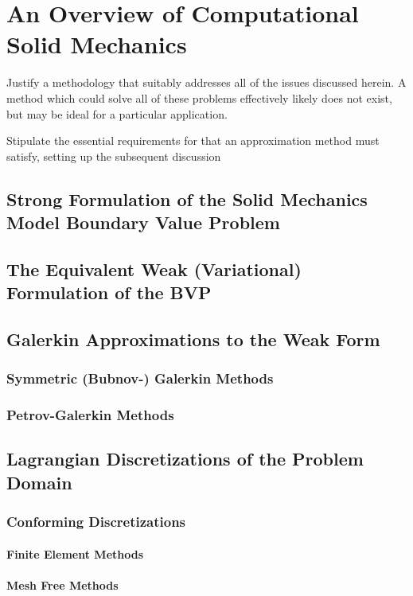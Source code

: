 \chapter{An Overview of Computational Solid Mechanics}
%
Justify a methodology that suitably addresses all of the issues discussed herein. A method which could solve all of these problems effectively likely does not exist, but may be ideal for a particular application.

Stipulate the essential requirements for that an approximation method must satisfy, setting up the subsequent discussion 

\section{Strong Formulation of the Solid Mechanics Model Boundary Value Problem}

\section{The Equivalent Weak (Variational) Formulation of the BVP}

\section{Galerkin Approximations to the Weak Form}
\subsection{Symmetric (Bubnov-) Galerkin Methods}
\subsection{Petrov-Galerkin Methods}

\section{Lagrangian Discretizations of the Problem Domain}
\subsection{Conforming Discretizations}
\subsubsection{Finite Element Methods}
\subsubsection{Mesh Free Methods}
